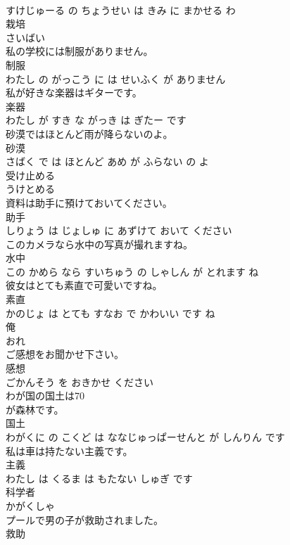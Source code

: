 \documentclass[8pt]{extreport}
\begin{document}
\begin{CJK}{UTF8}{min}
\\	すけじゅーる の ちょうせい は きみ に まかせる わ			
\\	栽培	
\\	さいばい		
\\	私の学校には制服がありません。	
\\	制服 
\\	わたし の がっこう に は せいふく が ありません			
\\	私が好きな楽器はギターです。	
\\	楽器 
\\	わたし が すき な がっき は ぎたー です			
\\	砂漠ではほとんど雨が降らないのよ。	
\\	砂漠 
\\	さばく で は ほとんど あめ が ふらない の よ			
\\	受け止める	
\\	うけとめる		
\\	資料は助手に預けておいてください。	
\\	助手 
\\	しりょう は じょしゅ に あずけて おいて ください			
\\	このカメラなら水中の写真が撮れますね。	
\\	水中 
\\	この かめら なら すいちゅう の しゃしん が とれます ね			
\\	彼女はとても素直で可愛いですね。	
\\	素直 
\\	かのじょ は とても すなお で かわいい です ね			
\\	俺	
\\	おれ		
\\	ご感想をお聞かせ下さい。	
\\	感想 
\\	ごかんそう を おきかせ ください			
\\	わが国の国土は70
\\	が森林です。	
\\	国土 
\\	わがくに の こくど は ななじゅっぱーせんと が しんりん です			
\\	私は車は持たない主義です。	
\\	主義 
\\	わたし は くるま は もたない しゅぎ です			
\\	科学者	
\\	かがくしゃ		
\\	プールで男の子が救助されました。	
\\	救助 

\end{CJK}
\end{document}
